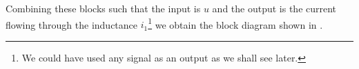 Combining these blocks such that the input is $u$ and the output is
the current flowing through the inductance $i_1$\footnote{We could have used any signal as an output as we shall
  see later.} we obtain the block diagram shown in .
\begin{slide}\label{slides:l13s2}
\end{slide}

